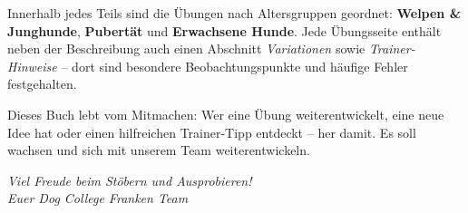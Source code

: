 \smallskip

Innerhalb jedes Teils sind die Übungen nach Altersgruppen geordnet:
\textbf{Welpen \& Junghunde}, \textbf{Pubertät} und \textbf{Erwachsene Hunde}.
Jede Übungsseite enthält neben der Beschreibung auch einen Abschnitt
\textit{Variationen} sowie \textit{Trainer-Hinweise} – dort sind besondere
Beobachtungspunkte und häufige Fehler festgehalten.

\bigskip

Dieses Buch lebt vom Mitmachen: Wer eine Übung weiterentwickelt, eine neue
Idee hat oder einen hilfreichen Trainer-Tipp entdeckt – her damit. Es soll
wachsen und sich mit unserem Team weiterentwickeln.

\bigskip

\begin{flushright}
  \textit{Viel Freude beim Stöbern und Ausprobieren!}\\[6pt]
  \textit{Euer Dog College Franken Team}\\[4pt]
  \textcolor{primary}{\faPaw~\faPaw~\faPaw}
\end{flushright}

\clearpage
